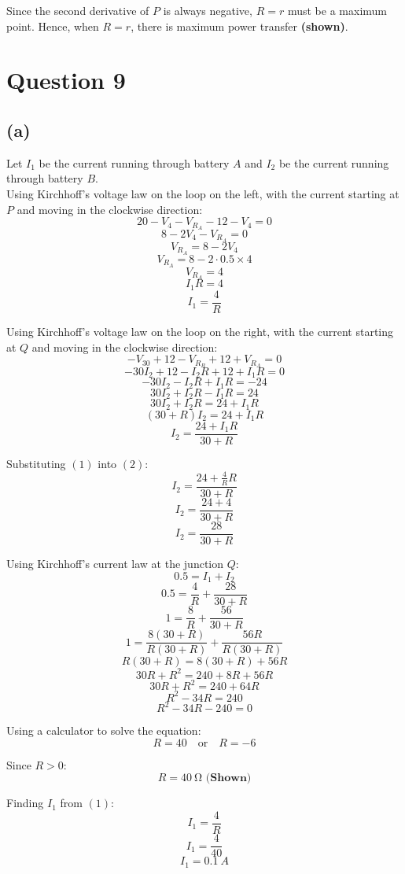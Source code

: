 \documentclass[11pt]{article}
\begin{document}
Since the second derivative of \(P\) is always negative, \(R = r\) must be a maximum point. Hence, when \(R = r\), there is maximum power transfer \textbf{(shown)}.

\newpage

\section{Question 9}
\label{sec:org85dd1ed}

\subsection{(a)}
\label{sec:org996b5b9}
Let \(I_1\) be the current running through battery \(A\) and \(I_2\) be the current running through battery \(B\).
\\[0pt]

Using Kirchhoff's voltage law on the loop on the left, with the current starting at \(P\) and moving in the clockwise direction:
\[20 - V_4 - V_{R_A} - 12 - V_{4} = 0\]
\[8 - 2V_4 - V_{R_A} = 0\]
\[V_{R_A} = 8 - 2V_4\]
\[V_{R_A} = 8 - 2 \cdot 0.5 \times 4\]
\[V_{R_A} = 4\]
\[I_1R = 4\]
\[I_1 = \frac{4}{R} \tag{1}\]

Using Kirchhoff's voltage law on the loop on the right, with the current starting at \(Q\) and moving in the clockwise direction:
\[-V_{30} + 12 - V_{R_B} + 12 + V_{R_A} = 0\]
\[-30I_2 + 12 - I_2 R + 12 + I_1 R = 0\]
\[-30I_2 - I_2 R + I_1 R = -24\]
\[30I_2 + I_2 R - I_1 R = 24\]
\[30I_2 + I_2 R = 24 + I_1 R\]
\[(30 + R)I_2 = 24 + I_1 R\]
\[I_2 = \frac{24 + I_1 R}{30 + R} \tag{2}\]

\newpage

Substituting \((1)\) into \((2)\):
\[I_2 = \frac{24 + \frac{4}{R} R}{30 + R}\]
\[I_2 = \frac{24 + 4}{30 + R}\]
\[I_2 = \frac{28}{30 + R} \tag{3}\]

Using Kirchhoff's current law at the junction \(Q\):
\[0.5 = I_1 + I_2\]
\[0.5 = \frac{4}{R} + \frac{28}{30 + R}\]
\[1 = \frac{8}{R} + \frac{56}{30 + R}\]
\[1 = \frac{8(30 + R)}{R (30 + R)} + \frac{56R}{R(30 + R)}\]
\[R(30 + R) = 8(30 + R) + 56R\]
\[30R + R^2 = 240 + 8R + 56R\]
\[30R + R^2 = 240 + 64R\]
\[R^2 - 34R = 240\]
\[R^2 - 34R - 240 = 0\]

Using a calculator to solve the equation:
\[R = 40 \quad \text{or} \quad R = -6\]

Since \(R > 0\):
\[R = \qty{40}{\unit{\ohm}} \textbf{ (Shown)}\]

Finding \(I_1\) from \((1)\):
\[I_1 = \frac{4}{R}\]
\[I_1 = \frac{4}{40}\]
\[I_1 = \qty{0.1}{\unit{A}}\]
\end{document}
